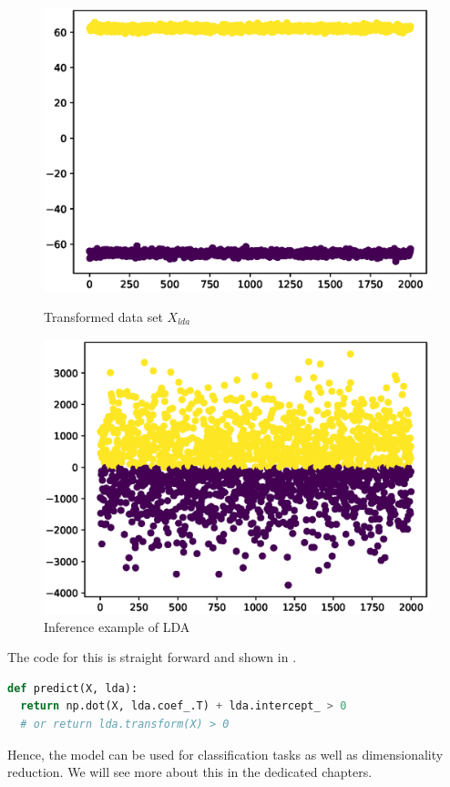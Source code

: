 \begin{figure}
  \centering
  \begin{minipage}[t]{.45\textwidth}
  \centering
  \includegraphics[width=.95\textwidth]{images/lda-1.eps}
  \caption{Transformed data set $X_{lda}$}
  \label{fig:lda-1}
  \end{minipage}
  \hfill
  \begin{minipage}[t]{.45\textwidth}
  \centering
  \includegraphics[width=.95\textwidth]{images/lda-2.eps}
  \caption{Inference example of LDA}
  \label{fig:lda-2}
\end{minipage}
\end{figure}

The code for this is straight forward and shown in .
\begin{lstlisting}[language=Python, caption={LDA inference in Python}, label={code:lda-inference}]
def predict(X, lda):
  return np.dot(X, lda.coef_.T) + lda.intercept_ > 0
  # or return lda.transform(X) > 0
\end{lstlisting}
Hence, the model can be used for classification tasks as well as dimensionality reduction.
We will see more about this in the dedicated chapters.


